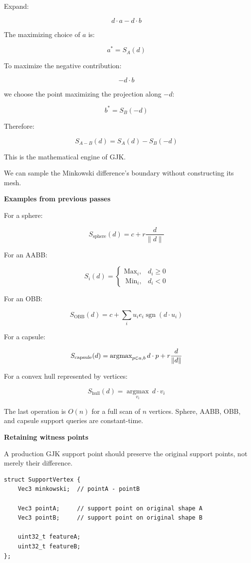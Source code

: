 Expand:

\[
d\cdot a-d\cdot b
\]

The maximizing choice of \(a\) is:

\[
a^*=S_A(d)
\]

To maximize the negative contribution:

\[
-d\cdot b
\]

we choose the point maximizing the projection along \(-d\):

\[
b^*=S_B(-d)
\]

Therefore:

\[
\boxed{ S_{A-B}(d)=S_A(d)-S_B(-d) }
\]

This is the mathematical engine of GJK.

We can sample the Minkowski difference's boundary without constructing its mesh.

\textbf{Examples from previous passes}

For a sphere:

\[
S_{\mathrm{sphere}}(d)=c+r\frac d{\|d\|}
\]

For an AABB:

\[
S_i(d)= \begin{cases} \mathrm{Max}_i,&d_i\ge0\\\ \mathrm{Min}_i,&d_i<0 \end{cases}
\]

For an OBB:

\[
S_{\mathrm{OBB}}(d)= c+\sum_i u_ie_i\operatorname{sgn}(d\cdot u_i)
\]

For a capsule:

\[
S_{\mathrm{capsule}}(d)= \operatorname{argmax}_{p\in\\{a,b\\}}d\cdot p +r\frac d{\|d\|}
\]

For a convex hull represented by vertices:

\[
S_{\mathrm{hull}}(d)= \underset{v_i}{\operatorname{argmax}}\ d\cdot v_i
\]

The last operation is \(O(n)\) for a full scan of \(n\) vertices. Sphere, AABB, OBB, and capsule support queries are constant-time.

\textbf{Retaining witness points}

A production GJK support point should preserve the original support points, not merely their difference.

\begin{verbatim}
struct SupportVertex {
    Vec3 minkowski;  // pointA - pointB

    Vec3 pointA;     // support point on original shape A
    Vec3 pointB;     // support point on original shape B

    uint32_t featureA;
    uint32_t featureB;
};
\end{verbatim}

